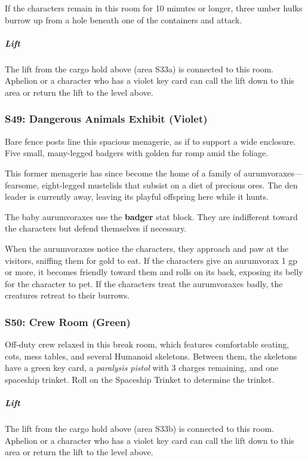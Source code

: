 \documentclass[10pt,a4paper,twoside,bg=print,twocolumn,openany,nodeprecatedcode]{dndbook}
\begin{document}
If the characters remain in this room for 10 minutes or longer, three umber hulks burrow up from a hole beneath one of the containers and attack.

\subparagraph{Lift}
The lift from the cargo hold above (area S33a) is connected to this room. Aphelion or a character who has a violet key card can call the lift down to this area or return the lift to the level above.

\subsubsection{S49: Dangerous Animals Exhibit (Violet)}
\begin{DndReadAloud}{}
Bare fence posts line this spacious menagerie, as if to support a wide enclosure. Five small, many-legged badgers with golden fur romp amid the foliage.

\end{DndReadAloud}

This former menagerie has since become the home of a family of aurumvoraxes—fearsome, eight-legged mustelids that subsist on a diet of precious ores. The den leader is currently away, leaving its playful offspring here while it hunts.

The baby aurumvoraxes use the \textbf{badger} stat block. They are indifferent toward the characters but defend themselves if necessary.

When the aurumvoraxes notice the characters, they approach and paw at the visitors, sniffing them for gold to eat. If the characters give an aurumvorax 1 gp or more, it becomes friendly toward them and rolls on its back, exposing its belly for the character to pet. If the characters treat the aurumvoraxes badly, the creatures retreat to their burrows.

\subsubsection{S50: Crew Room (Green)}
Off-duty crew relaxed in this break room, which features comfortable seating, cots, mess tables, and several Humanoid skeletons. Between them, the skeletons have a green key card, a \textit{paralysis pistol} with 3 charges remaining, and one spaceship trinket. Roll on the Spaceship Trinket to determine the trinket.

\subparagraph{Lift}
The lift from the cargo hold above (area S33b) is connected to this room. Aphelion or a character who has a violet key card can call the lift down to this area or return the lift to the level above.
\end{document}
